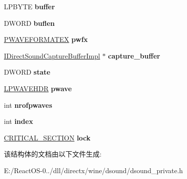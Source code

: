 \begin{DoxyCompactItemize}
\mbox{\label{struct_direct_sound_capture_device_af7532daa70e32e9239b8572d0dc27566}} 
L\+P\+B\+Y\+TE {\bfseries buffer}
\item 
\mbox{\label{struct_direct_sound_capture_device_ac99b627c73a2605504a8606d2026078e}} 
D\+W\+O\+RD {\bfseries buflen}
\item 
\mbox{\label{struct_direct_sound_capture_device_a599380c287a1ebd1c34fafe3d2c25b6d}} 
\hyperlink{struct___w_a_v_e_f_o_r_m_a_t_e_x}{P\+W\+A\+V\+E\+F\+O\+R\+M\+A\+T\+EX} {\bfseries pwfx}
\item 
\mbox{\label{struct_direct_sound_capture_device_ab0a3d815e0eb91735a7a90b5f4fa3539}} 
\hyperlink{struct_i_direct_sound_capture_buffer_impl}{I\+Direct\+Sound\+Capture\+Buffer\+Impl} $\ast$ {\bfseries capture\+\_\+buffer}
\item 
\mbox{\label{struct_direct_sound_capture_device_aaa0168fdf173f35880f2268b749c312a}} 
D\+W\+O\+RD {\bfseries state}
\item 
\mbox{\label{struct_direct_sound_capture_device_aef78a3a961974b8f865197091336aa77}} 
\hyperlink{structwavehdr__tag}{L\+P\+W\+A\+V\+E\+H\+DR} {\bfseries pwave}
\item 
\mbox{\label{struct_direct_sound_capture_device_a80e6111f46008ec13c644b251e1074f3}} 
int {\bfseries nrofpwaves}
\item 
\mbox{\label{struct_direct_sound_capture_device_a88c92f21bf99a7343d97f22090aa2dc3}} 
int {\bfseries index}
\item 
\mbox{\label{struct_direct_sound_capture_device_a6400a83ed7c7e00352e29d01e9bb97d9}} 
\hyperlink{struct___c_r_i_t_i_c_a_l___s_e_c_t_i_o_n}{C\+R\+I\+T\+I\+C\+A\+L\+\_\+\+S\+E\+C\+T\+I\+ON} {\bfseries lock}
\end{DoxyCompactItemize}


该结构体的文档由以下文件生成\+:\begin{DoxyCompactItemize}
\item 
E\+:/\+React\+O\+S-\/0../dll/directx/wine/dsound/dsound\+\_\+private.\+h\end{DoxyCompactItemize}
